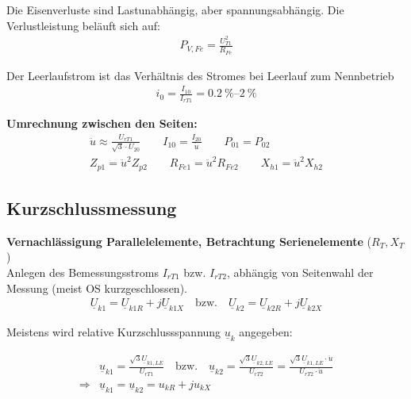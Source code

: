     Die Eisenverluste sind Lastunabhängig, aber spannungsabhängig. Die Verlustleistung beläuft sich auf:
    \vspace{-6pt}
    \begin{align*}
        P_{V,Fe} = \frac{U_{T1}^2}{R_{Fe}}
    \end{align*}

    Der Leerlaufstrom ist das Verhältnis des Stromes bei Leerlauf zum Nennbetrieb
    \vspace{-10pt}
    \begin{align*}
        i_0 = \frac{I_{10}}{I_{rT1}} = \SIrange{0.2}{2}{\percent}
    \end{align*}

    \textbf{Umrechnung zwischen den Seiten: }
    \begin{gather*}
        \ddot{u} \approx \frac{U_{rT1}}{\sqrt{3} \cdot U_{20}} \qquad I_{10} = \frac{I_{20}}{\ddot{u}} \qquad P_{01} = P_{02} \\
        Z_{p1} = \ddot{u}^2 Z_{p2} \qquad R_{Fe1} = \ddot{u}^2 R_{Fe2} \qquad X_{h1} = \ddot{u}^2 X_{h2}
    \end{gather*}

\subsection{Kurzschlussmessung}
    \textbf{Vernachlässigung Parallelelemente, Betrachtung Serienelemente} (\(R_T, X_T\)) \\
    Anlegen des Bemessungsstroms \(I_{rT1}\) bzw. \(I_{rT2}\), abhängig von Seitenwahl der Messung (meist OS kurzgeschlossen).
    \begin{align*}
        \underline{U}_{k1} = \underline{U}_{k1R} + j\underline{U}_{k1X} \quad \text{bzw.} \quad \underline{U}_{k2} = \underline{U}_{k2R} + j\underline{U}_{k2X}
    \end{align*}

    Meistens wird relative Kurzschlussspannung \(\underline{u}_k\) angegeben:

    \begin{align*}
        &\underline{u}_{k1} = \frac{\sqrt{3} \underline{U}_{k1,LE}}{U_{rT1}} \quad \text{bzw.} \quad \underline{u}_{k2} = \frac{\sqrt{3} \underline{U}_{k2,LE}}{U_{rT2}} = \frac{\sqrt{3} \underline{U}_{k1,LE} \cdot \ddot{u}}{U_{rT2} \cdot \ddot{u}} \\
        \Rightarrow &\boxed{\underline{u}_{k1} = \underline{u}_{k2} = u_{kR} + ju_{kX}}
    \end{align*}


